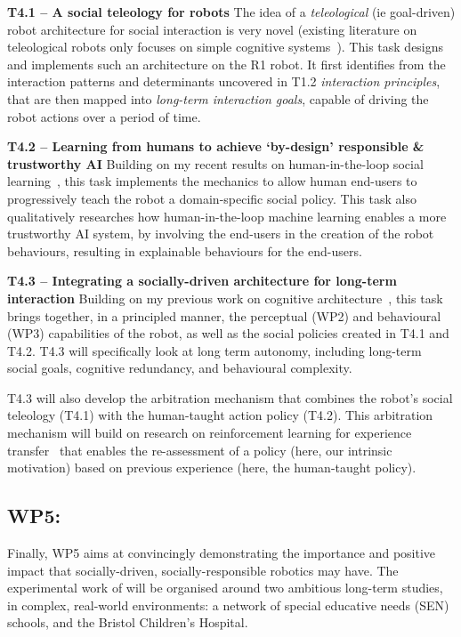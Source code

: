 \textbf{T4.1 -- A social teleology for robots} The idea of a \emph{teleological}
(ie goal-driven) robot architecture for social interaction is very novel
(existing literature on teleological robots only focuses on simple cognitive
systems~\cite{oudeyer2005playground,forestier2017unified}). This task designs
and implements such an architecture on the R1 robot. It first identifies from
the interaction patterns and determinants uncovered in T1.2 \emph{interaction
principles}, that are then mapped into \emph{long-term interaction goals}, capable of
driving the robot actions over a period of time.

\textbf{T4.2 -- Learning from humans to achieve `by-design' responsible \&
trustworthy AI} Building on my recent results on human-in-the-loop social
learning~\cite{senft2017supervised,senft2019teaching,winkle2020couch}, this task
implements the mechanics to allow human end-users to progressively teach the
robot a domain-specific social policy.  This task also qualitatively researches
how human-in-the-loop machine learning enables a more trustworthy AI system, by
involving the end-users in the creation of the robot behaviours, resulting in
explainable behaviours for the end-users.

\textbf{T4.3 -- Integrating a socially-driven architecture for long-term
interaction} Building on my previous work on cognitive
architecture~\cite{lemaignan2017artificial}, this task brings together, in a
principled manner, the perceptual (WP2) and behavioural
(WP3) capabilities of the robot, as well as the social policies created in T4.1 and
T4.2. T4.3 will specifically look at long term autonomy, including long-term
social goals, cognitive redundancy, and behavioural complexity.

T4.3 will also develop the arbitration mechanism that combines the robot's
social teleology (T4.1) with the human-taught action policy (T4.2). This
arbitration mechanism will build on research on reinforcement learning for
experience transfer~\cite{madden2004transfer} that enables the re-assessment of
a policy (here, our intrinsic motivation) based on previous experience (here,
the human-taught policy).

\subsection{WP5: \textbf{\wpFive}}

Finally, WP5 aims at convincingly demonstrating the importance and positive
impact that socially-driven, socially-responsible robotics may have. The
experimental work of \project will be organised around two ambitious long-term
studies, in complex, real-world environments: a network of special educative
needs (SEN) schools, and the Bristol Children's Hospital.

